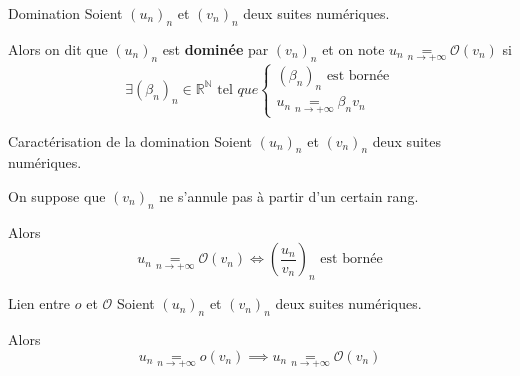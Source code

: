     \begin{defi}{Domination}{}
	    Soient $(u_n)_n$ et $(v_n)_n$ deux suites numériques.

	    Alors on dit que $(u_n)_n$ est \textbf{dominée} par $(v_n)_n$ et on note $u_n \underset{n \rightarrow +\infty}{=} \mathcal{O}(v_n)$ si
	    \[ \exists (\beta_n)_n \in \mathbb{R}^{\mathbb{N}} \text{ tel } que \left\{ \begin{array}{ll}
	    (\beta_n)_n \text{ est bornée} \\
	    u_n \underset{n \rightarrow +\infty}{=} \beta_n v_n
	    \end{array} \right. \]
    \end{defi}

    \begin{theo}{Caractérisation de la domination}{}
        Soient $(u_n)_n$ et $(v_n)_n$ deux suites numériques.
    
        On suppose que $(v_n)_n$ ne s’annule pas à partir d’un certain rang.
    
        Alors \[ u_n \underset{n \rightarrow +\infty}{=} \mathcal{O}(v_n) \iff \left( \frac{u_n}{v_n} \right)_n \text{ est bornée} \]
    \end{theo}

    \begin{prop}{Lien entre $o$ et $\mathcal{O}$}{}
        Soient $(u_n)_n$ et $(v_n)_n$ deux suites numériques.
    
        Alors \[ u_n \underset{n \rightarrow +\infty}{=} o(v_n) \implies u_n \underset{n \rightarrow +\infty}{=} \mathcal{O}(v_n) \]
    \end{prop}

